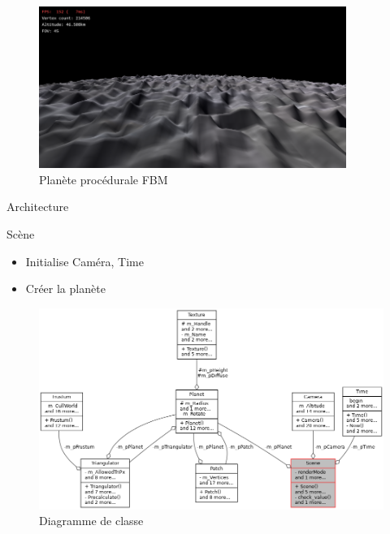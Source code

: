 

\begin{frame}
  \begin{figure}[!ht]
    \centering
    \includegraphics[width=10cm]{img/landscape.png}
    \caption{Planète procédurale FBM}
    \label{fig:landscape}
  \end{figure}
\end{frame} 

\begin{frame}{Architecture}

Scène
\begin{itemize}
    \item Initialise Caméra, Time
    \item Créer la planète
\end{itemize}

\begin{figure}
   \includegraphics[scale=0.30]{img/scene_uml.png}
   \caption{Diagramme de classe}
\end{figure}

\end{frame}

